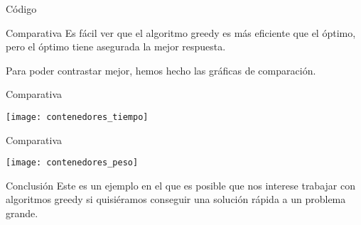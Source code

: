 \begin{frame}[fragile]{Código}
	\resizebox{10cm}{!}{
	}
\end{frame}

\begin{frame}{Comparativa}
	Es fácil ver que el algoritmo greedy es más eficiente que el óptimo, pero el óptimo tiene asegurada la mejor respuesta.

	Para poder contrastar mejor, hemos hecho las gráficas de comparación.
\end{frame}

\begin{frame}{Comparativa}
	\begin{center}
		\texttt{[image: contenedores\_tiempo]}
	\end{center}
\end{frame}

\begin{frame}{Comparativa}
	\begin{center}
		\texttt{[image: contenedores\_peso]}
	\end{center}
\end{frame}

\begin{frame}{Conclusión}
	Este es un ejemplo en el que es posible que nos interese trabajar con algoritmos greedy si quisiéramos conseguir una solución rápida a un problema grande.
\end{frame}
